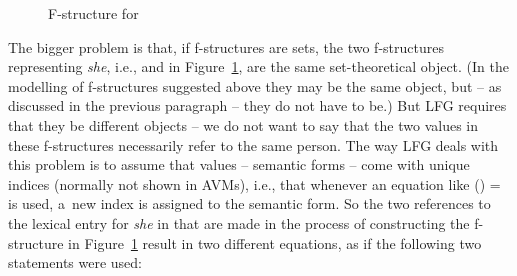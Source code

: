 \documentclass[output=paper,hidelinks]{langscibook}
\begin{document}
\begin{figure}
  \caption{F-structure for \label{fig:lfg:sheshe}}
\end{figure}

The bigger problem is that, if f-structures are sets, the two f-structures representing \emph{she}, i.e., \avm{\1} and  in Figure~\ref{fig:lfg:sheshe}, are the same set-theoretical object.  (In the modelling of f-structures suggested above they may be the same object, but -- as discussed in the previous paragraph -- they do not have to be.)  But LFG requires that they be different objects -- we do not want to say that the two  values in these f-structures necessarily refer to the same person.  The way LFG deals with this problem is to assume that \PRED values -- semantic forms -- come with unique indices (normally not shown in AVMs), i.e., that whenever an equation like (\UP\PRED) =  is used, a~new index is assigned to the semantic form.  So the two references to the lexical entry for \emph{she} in  that are made in the process of constructing the f-structure in Figure~\ref{fig:lfg:sheshe} result in two different equations, as if the following two statements were used:
\end{document}
